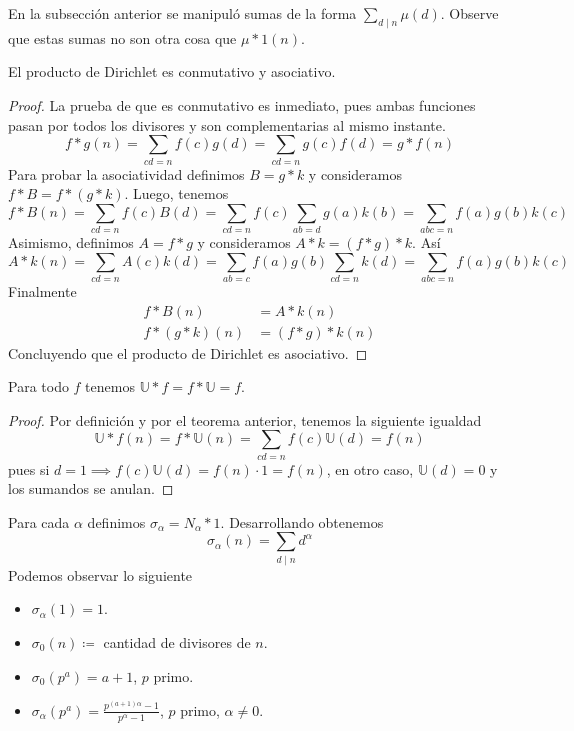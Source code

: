 \documentclass[main.tex]{subfiles}
\begin{document}
\begin{example}
En la subsecci\'on anterior se manipul\'o sumas de la forma $\sum_{d \mid n}\mu(d)$. Observe que estas sumas no son otra cosa que $\mu*1(n)$.
\end{example}
\begin{theorem}
El producto de Dirichlet es conmutativo y asociativo.
\end{theorem}
\begin{proof}
La prueba de que es conmutativo es inmediato, pues ambas funciones pasan por todos los divisores y son complementarias al mismo instante.
$$f*g(n) = \sum_{cd = n}f(c)g(d) = \sum_{cd = n}g(c)f(d) = g*f(n)$$
Para probar la asociatividad definimos $B = g * k$ y consideramos $f * B = f * (g * k)$. Luego, tenemos
$$f*B(n) = \sum_{cd = n}f(c)B(d) = \sum_{cd = n}f(c)\sum_{ab = d}g(a)k(b) = \sum_{abc = n}f(a)g(b)k(c)$$
Asimismo, definimos $A = f*g$ y consideramos $A*k = (f*g)*k$. As\'i
$$A*k(n) = \sum_{cd = n}A(c)k(d) = \sum_{ab = c}f(a)g(b)\sum_{cd = n}k(d) = \sum_{abc=n}f(a)g(b)k(c)$$
Finalmente
\begin{align*}
    f*B(n) &= A*k(n)\\
    f*(g*k)(n) &= (f*g)*k(n)
\end{align*}
Concluyendo que el producto de Dirichlet es asociativo.
\end{proof}
\begin{theorem}
Para todo $f$ tenemos $\mathbb U * f = f * \mathbb U = f$.
\end{theorem}
\begin{proof}
Por definici\'on y por el teorema anterior, tenemos la siguiente igualdad
$$\mathbb U * f(n) = f * \mathbb U(n) = \sum_{cd = n} f(c)\mathbb U(d) = f(n)$$
pues si $d = 1 \implies f(c)\mathbb U(d) = f(n) \cdot 1 = f(n)$, en otro caso, $\mathbb U(d) = 0$ y los sumandos se anulan.
\end{proof}
\begin{example}
Para cada $\alpha$ definimos $\sigma_\alpha = N_\alpha * 1$. Desarrollando obtenemos
$$\sigma_\alpha(n) = \sum_{d \mid n} d^\alpha$$
Podemos observar lo siguiente
\begin{itemize}
    \item $\sigma_\alpha(1) = 1$.
    \item $\sigma_0(n) \coloneqq$ cantidad de divisores de $n$.
    \item $\sigma_0(p^a) = a + 1$, $p$ primo.
    \item $\sigma_\alpha(p^a) = \frac{p^{(a + 1)\alpha}-1}{p^\alpha-1}$, $p$ primo, $\alpha \not= 0$.
\end{itemize}
\end{example}
\end{document}
